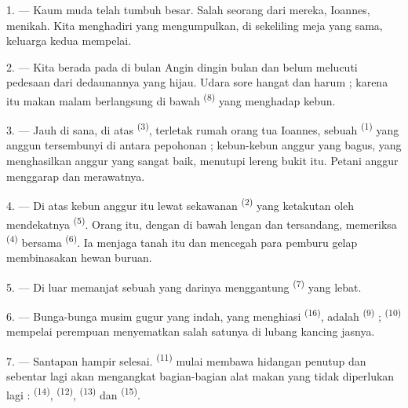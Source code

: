 \VUsaut{4.0mm}
\VUsaut{1.6mm}
\VUsaut{3.2mm}

\VUsaut{1.6mm}
\VUsaut{2.6mm}

\VUsaut{3.0mm}

1. --- Kaum muda telah tumbuh besar. Salah seorang dari mereka,
Ioannes, menikah. Kita menghadiri  yang
mengumpulkan, di sekeliling meja yang sama, keluarga kedua mempelai.

2. --- Kita berada pada  di bulan
 Angin dingin bulan  dan
 belum melucuti pedesaan dari dedaunannya yang hijau.
Udara sore hangat dan harum ; karena itu makan malam berlangsung di
bawah  \textsuperscript{(8)} yang menghadap kebun.

3. --- Jauh di sana, di atas  \textsuperscript{(3)},
terletak rumah orang tua Ioannes, sebuah 
\textsuperscript{(1)} yang anggun tersembunyi di antara pepohonan ;
kebun-kebun anggur yang bagus, yang menghasilkan anggur yang sangat
baik, menutupi lereng bukit itu. Petani anggur menggarap dan
merawatnya.

4. --- Di atas kebun anggur itu lewat sekawanan 
\textsuperscript{(2)} yang ketakutan oleh mendekatnya  \textsuperscript{(5)}. Orang itu, dengan  di
bawah lengan dan  tersandang, memeriksa
 \textsuperscript{(4)} bersama 
\textsuperscript{(6)}. Ia menjaga tanah itu dan mencegah para pemburu
gelap membinasakan hewan buruan.

5. --- Di luar  memanjat sebuah  yang darinya menggantung 
\textsuperscript{(7)} yang lebat.

6. --- Bunga-bunga musim gugur yang indah, yang menghiasi
 \textsuperscript{(16)}, adalah 
\textsuperscript{(9)} ;  \textsuperscript{(10)} mempelai
perempuan menyematkan salah satunya di lubang kancing jasnya.

7. --- Santapan hampir selesai.  \textsuperscript{(11)}
mulai membawa hidangan penutup dan sebentar lagi akan mengangkat
bagian-bagian alat makan yang tidak diperlukan lagi :
 \textsuperscript{(14)}, 
\textsuperscript{(12)},  \textsuperscript{(13)} dan
 \textsuperscript{(15)}.

